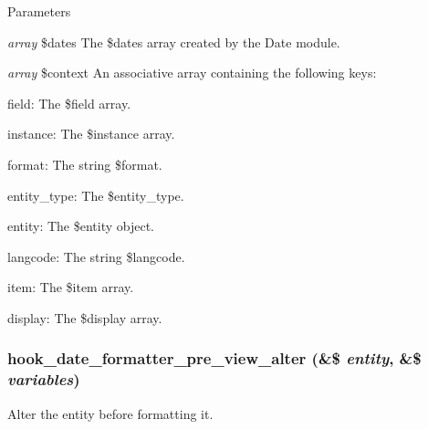 \begin{DoxyParams}{Parameters}
\item[{\em array}]\$dates The \$dates array created by the Date module. \item[{\em array}]\$context An associative array containing the following keys:
\begin{DoxyItemize}
\item field: The \$field array.
\item instance: The \$instance array.
\item format: The string \$format.
\item entity\_\-type: The \$entity\_\-type.
\item entity: The \$entity object.
\item langcode: The string \$langcode.
\item item: The \$item array.
\item display: The \$display array. 
\end{DoxyItemize}\end{DoxyParams}
\hypertarget{date_8api_8php_a224b13fafa75d248a1d2b33d1c1f409e}{
\subsubsection[{hook\_\-date\_\-formatter\_\-pre\_\-view\_\-alter}]{\setlength{\rightskip}{0pt plus 5cm}hook\_\-date\_\-formatter\_\-pre\_\-view\_\-alter (\&\$ {\em entity}, \/  \&\$ {\em variables})}}
\label{date_8api_8php_a224b13fafa75d248a1d2b33d1c1f409e}
Alter the entity before formatting it.


